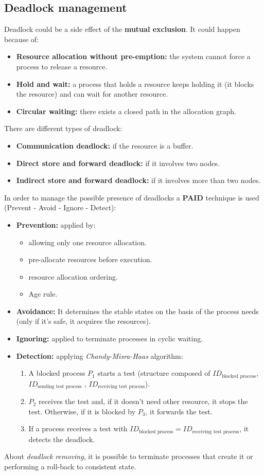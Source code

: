 \subsection{Deadlock management}
Deadlock could be a side effect of the \textbf{mutual exclusion}. It could happen because of:
\begin{itemize}
	\item \textbf{Resource allocation without pre-emption:} the system cannot force a process to release a resource.
	\item \textbf{Hold and wait:} a process that holds a resource keeps holding it (it blocks the resource) and can wait for another resource.
	\item \textbf{Circular waiting:} there exists a closed path in the allocation graph.
\end{itemize}
There are different types of deadlock:
\begin{itemize}
	\item \textbf{Communication deadlock:} if the resource is a buffer.
	\item \textbf{Direct store and forward deadlock:} if it involves two nodes.
	\item \textbf{Indirect store and forward deadlock:} if it involves more than two nodes.
\end{itemize}
In order to manage the possible presence of deadlocks a \textbf{PAID} technique is used (Prevent - Avoid - Ignore - Detect):
\begin{itemize}
	\item \textbf{Prevention:} applied by:
		\begin{itemize}
			\item allowing only one resource allocation.
			\item pre-allocate resources before execution.
			\item resource allocation ordering.
			\item Age rule. 
		\end{itemize}
	\item \textbf{Avoidance:} It determines the stable states on the basis of the process needs (only if it's safe, it acquires the resources).
	\item \textbf{Ignoring:} applied to terminate processes in cyclic waiting.
	\item \textbf{Detection:} applying \textit{Chandy-Misra-Haas} algorithm:
		\begin{enumerate}
			\item A blocked process $P_1$ starts a test (structure composed of $ID_{\text{blocked process}}$, $ID_{\text{sending test process}}$ , $ID_{\text{receiving test process}}$).
			\item $P_2$ receives the test and, if it doesn’t need other resource, it stops the test. Otherwise, if it is blocked by $P_3$, it forwards the test.
			\item If a process receives a test with $ID_{\text{blocked process}} = ID_{\text{receiving test process}}$, it detects the deadlock.
		\end{enumerate}
	
\end{itemize} 
About \textit{deadlock removing}, it is possible to terminate processes that create it or performing a roll-back to consistent state.
